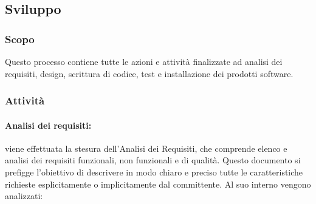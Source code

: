 \subsection{Sviluppo}
\subsubsection{Scopo} Questo processo contiene tutte le azioni e attività finalizzate ad analisi dei requisiti, design, scrittura di codice, test e installazione dei prodotti software\glo\:.
\subsubsection{Attività}
\paragraph{Analisi dei requisiti:} viene effettuata la stesura dell'Analisi dei Requisiti, che comprende elenco e analisi dei requisiti funzionali, non funzionali e di qualità. Questo documento si prefigge l'obiettivo di descrivere in modo chiaro e preciso tutte le caratteristiche richieste esplicitamente o implicitamente dal committente.
    Al suo interno vengono analizzati:
